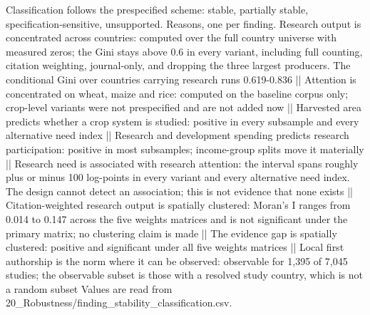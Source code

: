 \begin{table}[htbp]
\begin{minipage}{\linewidth}
Classification follows the prespecified scheme: stable, partially stable, specification-sensitive, unsupported. Reasons, one per finding. Research output is concentrated across countries: computed over the full country universe with measured zeros; the Gini stays above 0.6 in every variant, including full counting, citation weighting, journal-only, and dropping the three largest producers. The conditional Gini over countries carrying research runs 0.619-0.836 || Attention is concentrated on wheat, maize and rice: computed on the baseline corpus only; crop-level variants were not prespecified and are not added now || Harvested area predicts whether a crop system is studied: positive in every subsample and every alternative need index || Research and development spending predicts research participation: positive in most subsamples; income-group splits move it materially || Research need is associated with research attention: the interval spans roughly plus or minus 100 log-points in every variant and every alternative need index. The design cannot detect an association; this is not evidence that none exists || Citation-weighted research output is spatially clustered: Moran's I ranges from 0.014 to 0.147 across the five weights matrices and is not significant under the primary matrix; no clustering claim is made || The evidence gap is spatially clustered: positive and significant under all five weights matrices || Local first authorship is the norm where it can be observed: observable for 1,395 of 7,045 studies; the observable subset is those with a resolved study country, which is not a random subset Values are read from 20\_Robustness/finding\_stability\_classification.csv.
\end{minipage}
\end{table}
